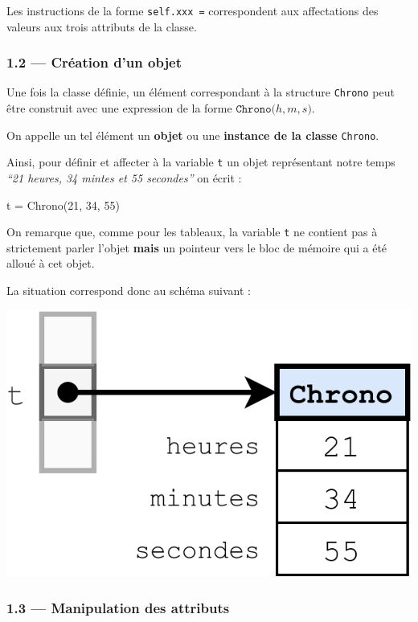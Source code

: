 \documentclass[a4paper,17pt]{extarticle}
\newenvironment{Shaded}{}{}
\newcommand{\DecValTok}[1]{\textcolor[rgb]{0.25,0.63,0.44}{{#1}}}
\newcommand{\NormalTok}[1]{{#1}}
\newcommand{\OperatorTok}[1]{\textcolor[rgb]{0.40,0.40,0.40}{{#1}}}
\begin{document}
Les instructions de la forme \texttt{self.xxx\ =} correspondent aux
affectations des valeurs aux trois attributs de la classe.

    \hypertarget{cruxe9ation-dun-objet}{%
\subsubsection{1.2 --- Création d'un
objet}\label{cruxe9ation-dun-objet}}

    Une fois la classe définie, un élément correspondant à la structure
\texttt{Chrono} peut être construit avec une expression de la forme
\(\texttt{Chrono(}h, m, s \texttt{)}\).
\begin{retenir}
    On appelle un tel élément un \textbf{objet} ou une \textbf{instance de
la classe} \texttt{Chrono}.

        \end{retenir}\begin{exemple}
    Ainsi, pour définir et affecter à la variable \texttt{t} un objet
représentant notre temps \emph{``21 heures, 34 mintes et 55 secondes''}
on écrit :

\begin{Shaded}
\begin{Highlighting}[]
\NormalTok{t }\OperatorTok{=}\NormalTok{ Chrono(}\DecValTok{21}\NormalTok{, }\DecValTok{34}\NormalTok{, }\DecValTok{55}\NormalTok{)}
\end{Highlighting}
\end{Shaded}

        \end{exemple}\begin{remarque}
    On remarque que, comme pour les tableaux, la variable \texttt{t} ne
contient pas à strictement parler l'objet \textbf{mais} un pointeur vers
le bloc de mémoire qui a été alloué à cet objet.

La situation correspond donc au schéma suivant :

\includegraphics{res/chrono01.png}

        \end{remarque}
    \hypertarget{manipulation-des-attributs}{%
\subsubsection{1.3 --- Manipulation des
attributs}\label{manipulation-des-attributs}}
\end{document}

